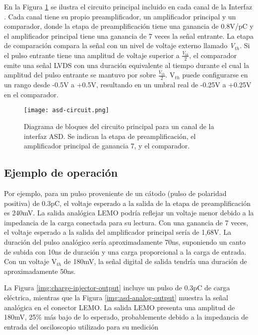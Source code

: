 En la Figura \ref{img:asd-circuit}  se ilustra el circuito principal incluido en cada canal de la Interfaz . Cada canal tiene su propio preamplificador, un amplificador principal y un comparador\cite{1999ATLASICs}, donde la etapa de preamplificación tiene una ganancia de 0.8V/pC y el amplificador principal tiene una ganancia de 7 veces la señal entrante. La etapa de comparación compara la señal con un nivel de voltaje externo llamado \textit{V$_{th}$}. Si el pulso entrante tiene una amplitud de voltaje superior a $\frac{V_{th}}{2}$, el comparador emite una señal LVDS con una duración equivalente al tiempo durante el cual la amplitud del pulso entrante se mantuvo por sobre $\frac{V_{th}}{2}$. V$_{th}$ puede configurarse en un rango desde -0.5V a +0.5V, resultando en un umbral real de -0.25V a +0.25V en el comparador\cite{1999ATLASICs}.

\begin{figure}[h]
	\centering
	\texttt{[image: asd-circuit.png]}
	\caption{Diagrama de bloques del circuito principal para un canal de la interfaz ASD. Se indican la etapa de preamplificación, el amplificador principal de ganancia 7, y el comparador.}
	\label{img:asd-circuit}
\end{figure}

\subsection{Ejemplo de operación}

Por ejemplo, para un pulso proveniente de un cátodo (pulso de polaridad positiva) de 0.3pC, el voltaje esperado a la salida de la etapa de preamplificación es 240mV. La salida analógica LEMO podría reflejar un voltaje menor debido a la impedancia de la carga conectada para su lectura. Con una ganancia de 7 veces, el voltaje esperado a la salida del amplificador principal sería de 1,68V. La duración del pulso analógico sería aproximadamente 70ns, suponiendo un canto de subida con 10ns de duración y una carga proporcional a la carga de entrada. Con un voltaje V$_{th}$ de 180mV, la señal digital de salida tendría una duración de aproximadamente 50ns.

La Figura \ref{img:charge-injector-output} incluye un pulso de 0.3pC de carga eléctrica, mientras que la Figura \ref{img:asd-analog-output} muestra la señal analógica en el conector LEMO. La salida LEMO presenta una amplitud de 180mV, 25\% más bajo de lo esperado, probablemente debido a la impedancia de entrada del osciloscopio utilizado para su medición

